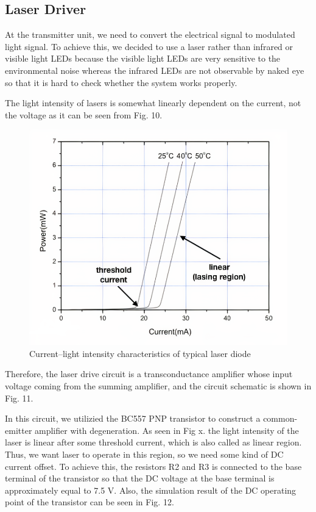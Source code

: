 \documentclass[conference]{IEEEtran}
\begin{document}
\subsection{Laser Driver}
At the transmitter unit, we need to convert the electrical signal to modulated light signal. To achieve this, we decided to use a laser rather than infrared or visible light LEDs because the visible light LEDs are very sensitive to the environmental noise whereas the infrared LEDs are not observable by naked eye so that it is hard to check whether the system works properly. \\ 
\par The light intensity of lasers is somewhat linearly dependent on the current, not the voltage as it can be seen from Fig. 10.
 \begin{figure}[H]
   \centerline{\includegraphics[scale=0.5]{laser.png}}
    \caption{Current–light intensity characteristics of typical laser diode}
\end{figure} 
\par Therefore, the laser drive circuit is a transconductance amplifier whose input voltage coming from the summing amplifier, and the circuit schematic is shown in Fig. 11.
\par In this circuit, we utilizied the BC557 PNP transistor to construct a common-emitter amplifier with degeneration. As seen in Fig x. the light intensity of the laser is linear after some threshold current, which is also called as linear region. Thus, we want laser to operate in this region, so we need some kind of DC current offset. To achieve this, the resistors R2 and R3 is connected to the base terminal of the transistor so that the DC voltage at the base terminal is approximately equal to 7.5 V. Also, the simulation result of the DC operating point of the transistor can be seen in Fig. 12. 
\end{document}
